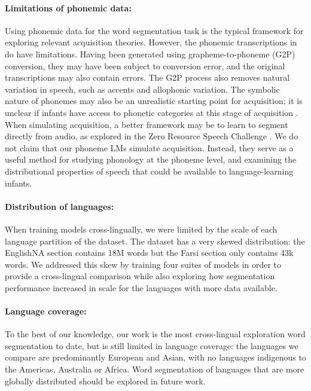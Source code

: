 \paragraph{Limitations of phonemic data:} Using phonemic data for the word segmentation task is the typical framework for exploring relevant acquisition theories. However, the phonemic transcriptions in \ipachildes do have limitations. Having been generated using grapheme-to-phoneme (G2P) conversion, they may have been subject to conversion error, and the original transcriptions may also contain errors. The G2P process also removes natural variation in speech, such as accents and allophonic variation. The symbolic nature of phonemes may also be an unrealistic starting point for acquisition; it is unclear if infants have access to phonetic categories at this stage of acquisition \citep{feldman_infants_2021, mcmurray_myth_2022}. When simulating acquisition, a better framework may be to learn to segment directly from audio, as explored in the Zero Resource Speech Challenge \citep{nguyen2020zero, dunbar2021zero}. We do not claim that our phoneme LMs simulate acquisition. Instead, they serve as a useful method for studying phonology at the phoneme level, and examining the distributional properties of speech that could be available to language-learning infants.

\paragraph{Distribution of languages:} When training models cross-lingually, we were limited by the scale of each language partition of the \ipachildes dataset. The dataset has a very skewed distribution: the EnglishNA section contains 18M words but the Farsi section only contains 43k words. We addressed this skew by training four suites of models in order to provide a cross-lingual comparison while also exploring how segmentation performance increased in scale for the languages with more data available.

\paragraph{Language coverage:}
To the best of our knowledge, our work is the most cross-lingual exploration word segmentation to date, but is still limited in language coverage: the languages we compare are predominantly European and Asian, with no languages indigenous to the Americas, Australia or Africa. Word segmentation of languages that are more globally distributed should be explored in future work.

